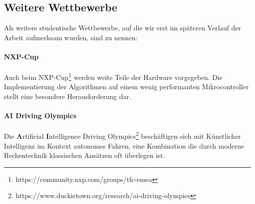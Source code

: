 \subsection{Weitere Wettbewerbe}
Als weitere studentische Wettbewerbe, auf die wir erst im späteren Verlauf der Arbeit aufmerksam wurden, sind zu nennen:
\paragraph{NXP-Cup}
Auch beim NXP-Cup\footnote{https://community.nxp.com/groups/tfc-emea} werden weite Teile der Hardware vorgegeben. Die Implementierung der Algorithmen auf einem wenig performanten Mikrocontroller stellt eine besondere Herausforderung dar. 
\paragraph{AI Driving Olympics}
Die \textbf{A}rtificial \textbf{I}ntelligence Driving Olympics\footnote{https://www.duckietown.org/research/ai-driving-olympics} beschäftigen sich mit Künstlicher Intelligenz im Kontext autonomes Fahren, eine Kombination die durch moderne Rechentechnik klassischen Ansätzen oft überlegen ist. 